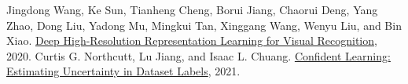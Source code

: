 \documentclass[a4j]{ujarticle}
\begin{document}
\begin{itemize}
\begin{itemize}
				\end{itemize}
		\end{itemize}

\clearpage

	\begin{thebibliography}{9} 
		 Jingdong Wang, Ke Sun, Tianheng Cheng, Borui Jiang, Chaorui Deng, Yang Zhao, Dong Liu, Yadong Mu, Mingkui Tan, Xinggang Wang, Wenyu Liu, and Bin Xiao. \href{https://arxiv.org/pdf/1908.07919.pdf}{Deep High-Resolution Representation Learning for Visual Recognition}, 2020.
		 Curtis G. Northcutt, Lu Jiang, and Isaac L. Chuang. \href{https://arxiv.org/pdf/1911.00068.pdf}{Confident Learning: Estimating Uncertainty in Dataset Labels}, 2021.
	\end{thebibliography}
\end{document}
